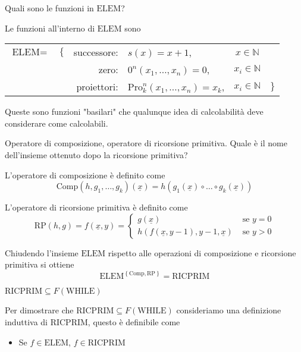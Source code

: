 \documentclass[12pt, answers]{exam}
\theoremstyle{plain}
\newcommand{\while}{\text{WHILE}}
\newcommand{\elem}{\text{ELEM}}
\newcommand{\comp}{\text{Comp}}
\newcommand{\rp}{\text{RP}}
\newcommand{\ricprim}{\text{RICPRIM}}
\newcommand{\N}{\mathbb{N}}
\newcommand{\pro}{\text{Pro}}
\begin{document}
\begin{questions}
        \question Quali sono le funzioni in $\elem$?
        
        \begin{solution}
            Le funzioni all'interno di $\elem$ sono
            \begin{center}
                \begin{tabular}{r c r l c l}
                    $\elem = $ & $\{$ & successore: & $s(x) = x + 1$, & $x \in \N$ & \\
                    && zero: & $0^n (x_1, \dots, x_n) = 0$, & $x_i \in \N$ & \\
                    && proiettori: & $\pro_k^n (x_1, \dots, x_n) = x_k$, & $x_i \in \N$& $\}$ \\
                \end{tabular}
            \end{center}
            
            Queste sono funzioni "basilari" che qualunque idea di calcolabilità deve considerare come calcolabili.
        \end{solution}
        
        \question Operatore di composizione, operatore di ricorsione primitiva. Quale è il nome dell'insieme ottenuto dopo la ricorsione primitiva?
        
        \begin{solution}
            L'operatore di composizione è definito come
            $$ \comp (h, g_1, \dots, g_k) (\underline{x}) = h(g_1 (\underline{x}) \circ \dots \circ g_k (\underline{x})) $$
            
            L'operatore di ricorsione primitiva è definito come
            $$
            \rp(h,g) = f(\underline{x}, y) = \begin{cases}
                g(\underline{x}) & \text{ se } y = 0 \\
                h(f(\underline{x}, y-1), y-1, \underline{x}) & \text{ se } y > 0 
            \end{cases}
            $$
            
            Chiudendo l'insieme $\elem$ rispetto alle operazioni di composizione e ricorsione primitiva si ottiene
            $$ \elem^{\left\{\comp, \rp\right\}} = \ricprim $$
        \end{solution}
        
        \question $\ricprim \subseteq F(\while)$
        
        \begin{solution}
            Per dimostrare che $\ricprim \subseteq F(\while)$ consideriamo una definizione induttiva di $\ricprim$, questo è definibile come
            \begin{itemize}
                \item Se $f \in \elem$, $f \in \ricprim$
                

\end{itemize}
\end{solution}
\end{questions}
\end{document}
